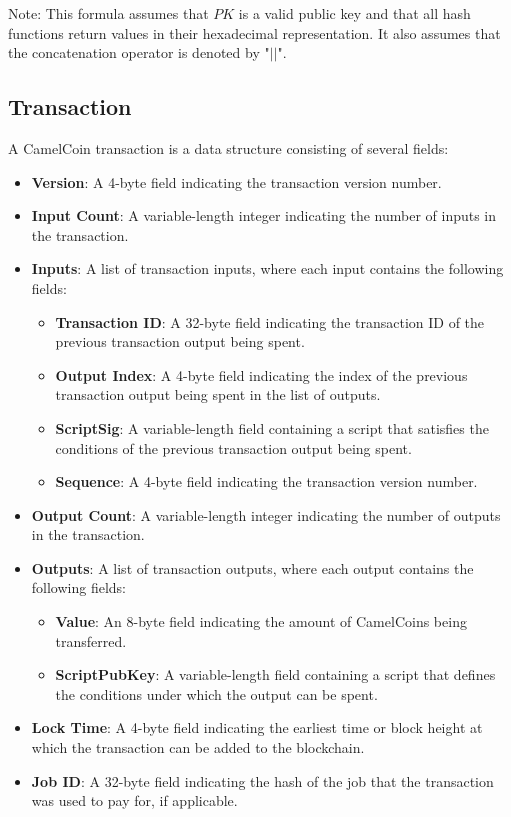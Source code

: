 \documentclass{article}
\begin{document}
Note: This formula assumes that $PK$ is a valid public key and that all hash functions return values in their hexadecimal representation. It also assumes that the concatenation operator is denoted by "$||$".
\subsection{Transaction}

A CamelCoin transaction is a data structure consisting of several fields:

\begin{itemize}
    \item \textbf{Version}: A 4-byte field indicating the transaction version number.
    \item \textbf{Input Count}: A variable-length integer indicating the number of inputs in the transaction.
    \item \textbf{Inputs}: A list of transaction inputs, where each input contains the following fields:
    \begin{itemize}
        \item \textbf{Transaction ID}: A 32-byte field indicating the transaction ID of the previous transaction output being spent.
        \item \textbf{Output Index}: A 4-byte field indicating the index of the previous transaction output being spent in the list of outputs.
        \item \textbf{ScriptSig}: A variable-length field containing a script that satisfies the conditions of the previous transaction output being spent.
        \item \textbf{Sequence}: A 4-byte field indicating the transaction version number.
    \end{itemize}
    \item \textbf{Output Count}: A variable-length integer indicating the number of outputs in the transaction.
    \item \textbf{Outputs}: A list of transaction outputs, where each output contains the following fields:
    \begin{itemize}
        \item \textbf{Value}: An 8-byte field indicating the amount of CamelCoins being transferred.
        \item \textbf{ScriptPubKey}: A variable-length field containing a script that defines the conditions under which the output can be spent.
    \end{itemize}
    \item \textbf{Lock Time}: A 4-byte field indicating the earliest time or block height at which the transaction can be added to the blockchain.
    \item \textbf{Job ID}: A 32-byte field indicating the hash of the job that the transaction was used to pay for, if applicable.
\end{itemize}
\end{document}
